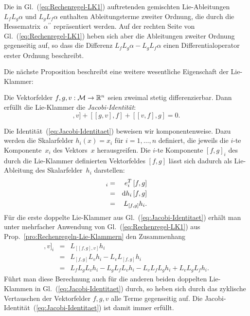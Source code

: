 Die in Gl.~(\ref{eq:Rechenregel-LK1}) auftretenden gemischten Lie-Ableitungen
$L_{f}L_{g}\alpha$ und $L_{g}L_{f}\alpha$ enthalten Ableitungsterme
zweiter Ordnung, die durch die Hessematrix~$\alpha^{\prime\prime}$
repräsentiert werden. Auf der rechten Seite von Gl.~(\ref{eq:Rechenregel-LK1})
heben sich aber die Ableitungen zweiter Ordnung gegenseitig auf, so
dass die Differenz $L_{f}L_{g}\alpha-L_{g}L_{f}\alpha$ einen Differentialoperator
erster Ordnung beschreibt.

Die nächste Proposition beschreibt eine weitere wesentliche Eigenschaft
der Lie-Klammer:

\begin{proposition}
Die Vektorfelder $f,g,v:\mathcal{M}\to{\mathbb{R}}^{n}$ seien zweimal stetig
differenzierbar. Dann erfüllt die Lie-Klammer die \emph{Jacobi-Identität}:
\begin{equation}
[[f,g],v]+[[g,v],f]+[[v,f],g]=0.\label{eq:Jacobi-Identitaet}
\end{equation}
\end{proposition}
\begin{svmultproof2}
Die Identität~(\ref{eq:Jacobi-Identitaet}) beweisen wir komponentenweise.
Dazu werden die Skalarfelder $h_{i}(x)=x_{i}$ für $i=1,\ldots,n$
definiert, die jeweils die $i$-te Komponente~$x_{i}$ des Vektors~$x$
herausgreifen. Die $i$-te Komponente $[f,g]_{i}$ des durch die Lie-Klammer
definierten Vektorfeldes $[f,g]$ lässt sich dadurch als Lie-Ableitung
des Skalarfelder~$h_{i}$ darstellen: 
\begin{eqnarray*}
[f,g]_{i} & = & e_{i}^{T}\,[f,g]\\
 & = & \D h_{i}\,[f,g]\\
 & = & L_{[f,g]}h_{i}.
\end{eqnarray*}
Für die erste doppelte Lie-Klammer aus Gl.~(\ref{eq:Jacobi-Identitaet})
erhält man unter mehrfacher Anwendung von Gl.~(\ref{eq:Rechenregel-LK1})
aus Prop.~\ref{pro:Rechenregeln-Lie-Klammern} den Zusammenhang 
\begin{eqnarray*}
[[f,g],v]_{i} & = & L_{[[f,g],v]}h_{i}\\
 & = & L_{[f,g]}L_{v}h_{i}-L_{v}L_{[f,g]}h_{i}\\
 & = & L_{f}L_{g}L_{v}h_{i}-L_{g}L_{f}L_{v}h_{i}-L_{v}L_{f}L_{g}h_{i}+L_{v}L_{g}L_{f}h_{i}.
\end{eqnarray*}
Führt man diese Berechnung auch für die anderen beiden doppelten Lie-Klammen
in Gl.~(\ref{eq:Jacobi-Identitaet}) durch, so heben sich durch das
zyklische Vertauschen der Vektorfelder $f,g,v$ alle Terme gegenseitig
auf. Die Jacobi-Identität~(\ref{eq:Jacobi-Identitaet}) ist damit
immer erfüllt.
\end{svmultproof2}

